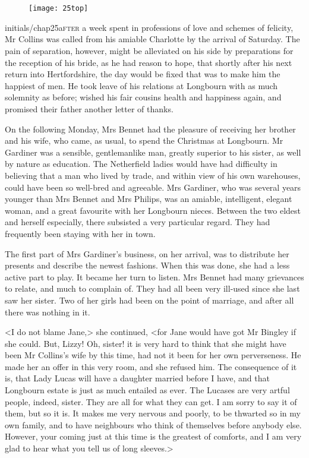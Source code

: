 \chapter[Chapter \thechapter]{}
	
\begin{figure}[t!]
	\centering
\texttt{[image: 25top]}
\end{figure}


\lettrine[lines=6,image=true]{initials/chap25a}{fter}  a week spent in professions of love and schemes of felicity, Mr Collins was called from his amiable Charlotte by the arrival of Saturday. The pain of separation, however, might be alleviated on his side by preparations for the reception of his bride, as he had reason to hope, that shortly after his next return into Hertfordshire, the day would be fixed that was to make him the happiest of men. He took leave of his relations at Longbourn with as much solemnity as before; wished his fair cousins health and happiness again, and promised their father another letter of thanks.

On the following Monday, Mrs Bennet had the pleasure of receiving her brother and his wife, who came, as usual, to spend the Christmas at Longbourn. Mr Gardiner was a sensible, gentlemanlike man, greatly superior to his sister, as well by nature as education. The Netherfield ladies would have had difficulty in believing that a man who lived by trade, and within view of his own warehouses, could have been so well-bred and agreeable. Mrs Gardiner, who was several years younger than Mrs Bennet and Mrs Philips, was an amiable, intelligent, elegant woman, and a great favourite with her Longbourn nieces. Between the two eldest and herself especially, there subsisted a very particular regard. They had frequently been staying with her in town.

The first part of Mrs Gardiner's business, on her arrival, was to distribute her presents and describe the newest fashions. When this was done, she had a less active part to play. It became her turn to listen. Mrs Bennet had many grievances to relate, and much to complain of. They had all been very ill-used since she last saw her sister. Two of her girls had been on the point of marriage, and after all there was nothing in it.

<I do not blame Jane,> she continued, <for Jane would have got Mr Bingley if she could. But, Lizzy! Oh, sister! it is very hard to think that she might have been Mr Collins's wife by this time, had not it been for her own perverseness. He made her an offer in this very room, and she refused him. The consequence of it is, that Lady Lucas will have a daughter married before I have, and that Longbourn estate is just as much entailed as ever. The Lucases are very artful people, indeed, sister. They are all for what they can get. I am sorry to say it of them, but so it is. It makes me very nervous and poorly, to be thwarted so in my own family, and to have neighbours who think of themselves before anybody else. However, your coming just at this time is the greatest of comforts, and I am very glad to hear what you tell us of long sleeves.>

